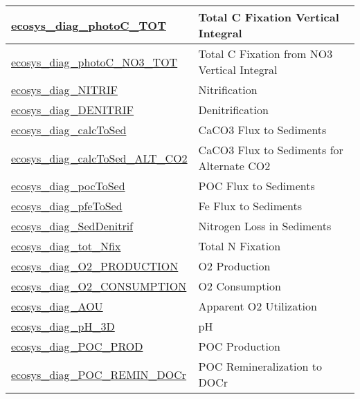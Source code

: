{\begin{center}
\begin{longtable}{| p{2.0in} | p{4.0in} |}
    \hline
    \hyperref[subsec:var_sec_forcing_ecosys_diag_photoC_TOT]{ecosys\_diag\_photoC\_TOT} & Total C Fixation Vertical Integral \\
    \hline
    \hyperref[subsec:var_sec_forcing_ecosys_diag_photoC_NO3_TOT]{ecosys\_diag\_photoC\_NO3\_\-TOT} & Total C Fixation from NO3 Vertical Integral \\
    \hline
    \hyperref[subsec:var_sec_forcing_ecosys_diag_NITRIF]{ecosys\_diag\_NITRIF} & Nitrification \\
    \hline
    \hyperref[subsec:var_sec_forcing_ecosys_diag_DENITRIF]{ecosys\_diag\_DENITRIF} & Denitrification \\
    \hline
    \hyperref[subsec:var_sec_forcing_ecosys_diag_calcToSed]{ecosys\_diag\_calcToSed} & CaCO3 Flux to Sediments \\
    \hline
    \hyperref[subsec:var_sec_forcing_ecosys_diag_calcToSed_ALT_CO2]{ecosys\_diag\_calcToSed\_ALT\_\-CO2} & CaCO3 Flux to Sediments for Alternate CO2 \\
    \hline
    \hyperref[subsec:var_sec_forcing_ecosys_diag_pocToSed]{ecosys\_diag\_pocToSed} & POC Flux to Sediments \\
    \hline
    \hyperref[subsec:var_sec_forcing_ecosys_diag_pfeToSed]{ecosys\_diag\_pfeToSed} & Fe Flux to Sediments \\
    \hline
    \hyperref[subsec:var_sec_forcing_ecosys_diag_SedDenitrif]{ecosys\_diag\_SedDenitrif} & Nitrogen Loss in Sediments \\
    \hline
    \hyperref[subsec:var_sec_forcing_ecosys_diag_tot_Nfix]{ecosys\_diag\_tot\_Nfix} & Total N Fixation \\
    \hline
    \hyperref[subsec:var_sec_forcing_ecosys_diag_O2_PRODUCTION]{ecosys\_diag\_O2\_\-PRODUCTION} & O2 Production \\
    \hline
    \hyperref[subsec:var_sec_forcing_ecosys_diag_O2_CONSUMPTION]{ecosys\_diag\_O2\_\-CONSUMPTION} & O2 Consumption \\
    \hline
    \hyperref[subsec:var_sec_forcing_ecosys_diag_AOU]{ecosys\_diag\_AOU} & Apparent O2 Utilization \\
    \hline
    \hyperref[subsec:var_sec_forcing_ecosys_diag_pH_3D]{ecosys\_diag\_pH\_3D} & pH \\
    \hline
    \hyperref[subsec:var_sec_forcing_ecosys_diag_POC_PROD]{ecosys\_diag\_POC\_PROD} & POC Production \\
    \hline
    \hyperref[subsec:var_sec_forcing_ecosys_diag_POC_REMIN_DOCr]{ecosys\_diag\_POC\_REMIN\_\-DOCr} & POC Remineralization to DOCr \\

\end{longtable}
\end{center}}
